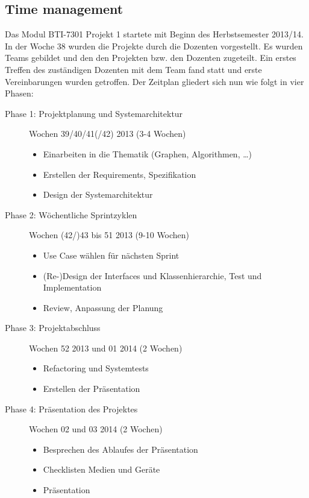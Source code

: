 \subsection{Time management}
\label{subsec:Time management}
Das Modul BTI-7301 Projekt 1 startete mit Beginn des Herbstsemester 2013/14. In der Woche 38 wurden die Projekte durch die Dozenten vorgestellt. Es wurden Teams gebildet und den den Projekten bzw. den Dozenten zugeteilt. Ein erstes Treffen des zust\"andigen Dozenten mit dem Team fand statt und erste Vereinbarungen wurden getroffen. Der Zeitplan gliedert sich nun wie folgt in vier Phasen:
\begin{description}
  \item[Phase 1: Projektplanung und Systemarchitektur] Wochen 39/40/41(/42) 2013 (3-4 Wochen)
  \begin{itemize}
    \item Einarbeiten in die Thematik (Graphen, Algorithmen, \dots)
    \item Erstellen der Requirements, Spezifikation
    \item Design der Systemarchitektur
  \end{itemize}
  \item[Phase 2: W\"ochentliche Sprintzyklen] Wochen (42/)43 bis 51 2013 (9-10 Wochen)
  \begin{itemize}
    \item Use Case w\"ahlen f\"ur n\"achsten Sprint
    \item (Re-)Design der Interfaces und Klassenhierarchie, Test und Implementation
    \item Review, Anpassung der Planung
  \end{itemize}
  \item[Phase 3: Projektabschluss] Wochen 52 2013 und 01 2014 (2 Wochen)
  \begin{itemize}
    \item Refactoring und Systemtests
    \item Erstellen der Pr\"asentation
  \end{itemize}
  \item[Phase 4: Pr\"asentation des Projektes] Wochen 02 und 03 2014 (2 Wochen)
  \begin{itemize}
    \item Besprechen des Ablaufes der Pr\"asentation
    \item Checklisten Medien und Ger\"ate
    \item Pr\"asentation
  \end{itemize}
\end{description}
% 
\newpage
